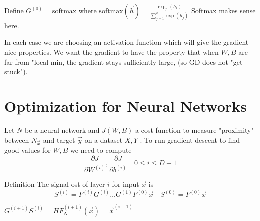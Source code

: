 \begin{example}
\begin{figure}[ht]
\end{figure}

Define  $G^{(0)}=  \mathrm{softmax}$ where   $\mathrm{softmax}(\vec{h})=\frac{\exp _{p}\left(h_{i}\right)}{\sum_{j=1}^{k} \exp \left(h_{j}\right)}$ 
Softmax makes sense here.
\end{example}

\begin{remark}
    In each case we are choosing an activation function which will give the gradient nice properties. We want the gradient to have the property that when  $W, B$  are far from "local min, the gradient stays sufficiently large, (so GD does not "get stuck").
\end{remark}


\section{Optimization for Neural Networks}
Let  $N$  be a neural network and  $J(W, B)$  a cost function to measure "proximity" between  $N_{\vec{x}}$  and target  $\vec{y}$  on a dataset  $X, Y$ . To run gradient descent to find good values for $W,B$ we need to compute
$$
\frac{\partial J}{\partial W^{(i)}}, \frac{\partial J}{\partial b^{(i)}} \quad 0 \leq i \leq D-1
$$

Definition The signal ost of layer $i$ for input  $\vec{x}$  is
$$
S^{(i)}=F^{(i)} G^{(i)} \ldots G^{(1)} F^{(0)} \vec{x} \quad S^{(0)}=F^{(0)} \vec{x}
$$
\begin{remark}
    $G^{(i+1)} S^{(i)}=H F_{N}^{(i+1)}(\vec{x})=\vec{x}^{(i+1)}$ 
\end{remark}


